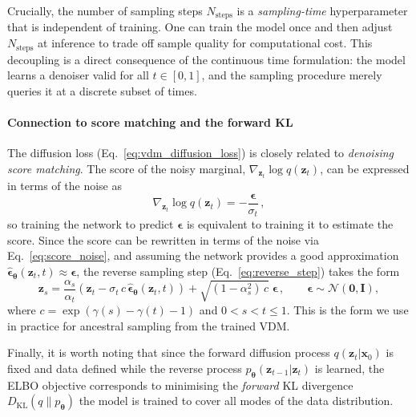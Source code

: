 Crucially, the number of sampling steps $N_{\mathrm{steps}}$ is a \emph{sampling-time} hyperparameter that is independent of training. One can train the model once and then adjust $N_{\mathrm{steps}}$ at inference to trade off sample quality for computational cost. This decoupling is a direct consequence of the continuous time formulation: the model learns a denoiser valid for all $t \in [0,1]$, and the sampling procedure merely queries it at a discrete subset of times.


\paragraph{Connection to score matching and the forward KL}
\label{sec:vdm_score}

The diffusion loss (Eq.~\ref{eq:vdm_diffusion_loss}) is closely related to \emph{denoising score matching}. The score of the noisy marginal, $\nabla_{\bm{z}_t}\log q(\bm{z}_t)$, can be expressed in terms of the noise as
\begin{equation}
    \nabla_{\bm{z}_t}\log q(\bm{z}_t) = -\frac{\bm{\epsilon}}{\sigma_t}\,,
    \label{eq:score_noise}
\end{equation}
so training the network to predict $\bm{\epsilon}$ is equivalent to training it to estimate the score.
Since the score can be rewritten in terms of the noise via Eq.~\ref{eq:score_noise}, and assuming the network provides a good approximation $\hat{\bm{\epsilon}}_{\bm{\theta}}(\bm{z}_t, t) \approx \bm{\epsilon}$, the reverse sampling step (Eq.~\ref{eq:reverse_step}) takes the form
\begin{equation}
    \bm{z}_{s} = \frac{\alpha_s}{\alpha_t}\left(\bm{z}_{t} - \sigma_t\, c\, \hat{\bm{\epsilon}}_{\bm{\theta}}(\bm{z}_t, t)\right) + \sqrt{(1-\alpha_s^2)\,c}\;\bm{\epsilon}\,, \qquad \bm{\epsilon} \sim \mathcal{N}(\bm{0},\bm{I}),
    \label{eq:ancestral_sampling}
\end{equation}
where $c = \exp\!\left(\gamma(s) - \gamma(t) - 1\right)$ and $0 < s < t \leq 1$. This is the form we use in practice for ancestral sampling from the trained VDM.


Finally, it is worth noting that since the forward diffusion process $q(\bm{z}_t | \bm{x}_0)$ is fixed and data defined while the reverse process $p_{\bm{\theta}}(\bm{z}_{t-1} | \bm{z}_t)$ is learned, the ELBO objective corresponds to minimising the \emph{forward} KL divergence $D_{\mathrm{KL}}(q \| p_{\bm{\theta}})$ the model is trained to cover all modes of the data distribution.


